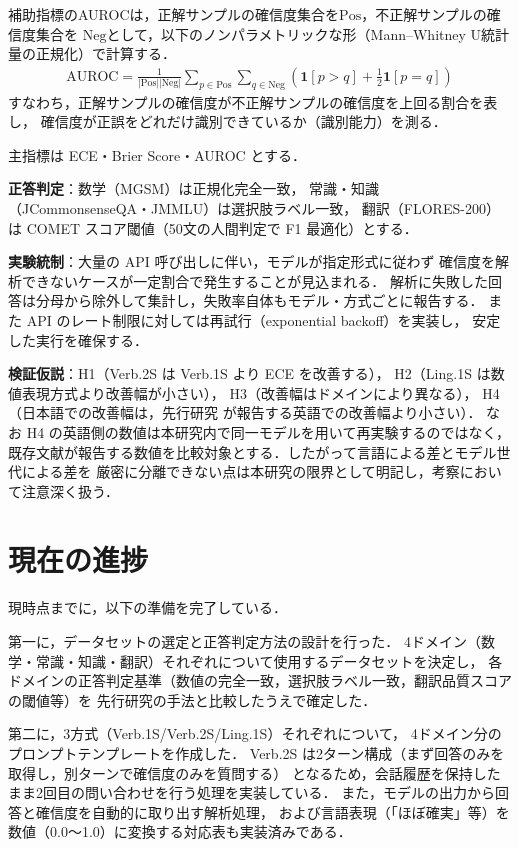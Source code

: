\documentclass[10pt,a4paper,twocolumn]{article}
\begin{document}
補助指標のAUROCは，正解サンプルの確信度集合を$\text{Pos}$，不正解サンプルの確信度集合を
$\text{Neg}$として，以下のノンパラメトリックな形（Mann–Whitney U統計量の正規化）で計算する．
\begin{align}
  \text{AUROC} = \frac{1}{|\text{Pos}||\text{Neg}|} \sum_{p \in \text{Pos}} \sum_{q \in \text{Neg}}
  \left( \mathbf{1}[p > q] + \tfrac{1}{2}\mathbf{1}[p = q] \right)
\end{align}
すなわち，正解サンプルの確信度が不正解サンプルの確信度を上回る割合を表し，
確信度が正誤をどれだけ識別できているか（識別能力）を測る．

主指標は ECE・Brier Score・AUROC とする．

\textbf{正答判定}：数学（MGSM）は正規化完全一致，
常識・知識（JCommonsenseQA・JMMLU）は選択肢ラベル一致，
翻訳（FLORES-200）は COMET スコア閾値（50文の人間判定で F1 最適化）とする．

\textbf{実験統制}：大量の API 呼び出しに伴い，モデルが指定形式に従わず
確信度を解析できないケースが一定割合で発生することが見込まれる．
解析に失敗した回答は分母から除外して集計し，失敗率自体もモデル・方式ごとに報告する．
また API のレート制限に対しては再試行（exponential backoff）を実装し，
安定した実行を確保する．

\textbf{検証仮説}：H1（Verb.2S は Verb.1S より ECE を改善する），
H2（Ling.1S は数値表現方式より改善幅が小さい），
H3（改善幅はドメインにより異なる），
H4（日本語での改善幅は，先行研究\cite{tian2023just,xiong2024can,xue2025mlingconf}
が報告する英語での改善幅より小さい）．
なお H4 の英語側の数値は本研究内で同一モデルを用いて再実験するのではなく，
既存文献が報告する数値を比較対象とする．したがって言語による差とモデル世代による差を
厳密に分離できない点は本研究の限界として明記し，考察において注意深く扱う．

\section{現在の進捗}

現時点までに，以下の準備を完了している．

第一に，データセットの選定と正答判定方法の設計を行った．
4ドメイン（数学・常識・知識・翻訳）それぞれについて使用するデータセットを決定し，
各ドメインの正答判定基準（数値の完全一致，選択肢ラベル一致，翻訳品質スコアの閾値等）を
先行研究の手法と比較したうえで確定した．

第二に，3方式（Verb.1S/Verb.2S/Ling.1S）それぞれについて，
4ドメイン分のプロンプトテンプレートを作成した．
Verb.2S は2ターン構成（まず回答のみを取得し，別ターンで確信度のみを質問する）
となるため，会話履歴を保持したまま2回目の問い合わせを行う処理を実装している．
また，モデルの出力から回答と確信度を自動的に取り出す解析処理，
および言語表現（「ほぼ確実」等）を数値（0.0〜1.0）に変換する対応表も実装済みである．
\end{document}
